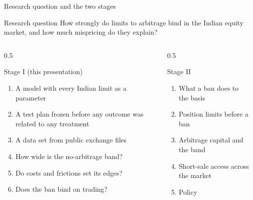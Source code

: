 \documentclass[11pt]{beamer}
\begin{document}
\begin{frame}{Research question and the two stages}
  \begin{block}{Research question}
    How strongly do limits to arbitrage bind in the Indian equity market, and how much mispricing do they explain?
  \end{block}
  \vspace{2pt}
  \begin{columns}[T]
    \begin{column}{0.5\textwidth}
      \begin{exampleblock}{Stage I (this presentation)}
        \scriptsize
        \begin{enumerate}
          \item A model with every Indian limit as a parameter
          \item A test plan frozen before any outcome was related to any treatment
          \item A data set from public exchange files
          \item How wide is the no-arbitrage band?
          \item Do costs and frictions set its edges?
          \item Does the ban bind on trading?
        \end{enumerate}
      \end{exampleblock}
    \end{column}
    \begin{column}{0.5\textwidth}
      \begin{block}{Stage II}
        \scriptsize
        \begin{enumerate}
          \item What a ban does to the basis
          \item Position limits before a ban
          \item Arbitrage capital and the band
          \item Short-sale access across the market
          \item Policy
        \end{enumerate}
      \end{block}
    \end{column}
  \end{columns}
\end{frame}
\end{document}
